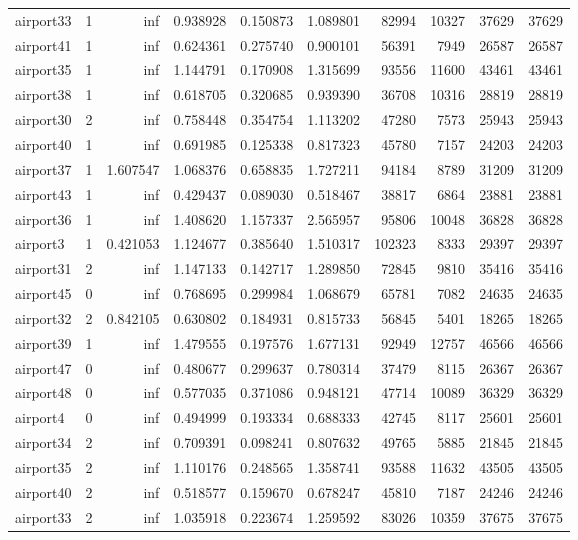 \begin{longtable}{|l|r|r|r|r|r|r|r|r|r|}
airport33 & 1 & inf & 0.938928 & 0.150873 & 1.089801 & 82994 & 10327 & 37629 & 37629 \\
airport41 & 1 & inf & 0.624361 & 0.275740 & 0.900101 & 56391 & 7949 & 26587 & 26587 \\
airport35 & 1 & inf & 1.144791 & 0.170908 & 1.315699 & 93556 & 11600 & 43461 & 43461 \\
airport38 & 1 & inf & 0.618705 & 0.320685 & 0.939390 & 36708 & 10316 & 28819 & 28819 \\
airport30 & 2 & inf & 0.758448 & 0.354754 & 1.113202 & 47280 & 7573 & 25943 & 25943 \\
airport40 & 1 & inf & 0.691985 & 0.125338 & 0.817323 & 45780 & 7157 & 24203 & 24203 \\
airport37 & 1 & 1.607547 & 1.068376 & 0.658835 & 1.727211 & 94184 & 8789 & 31209 & 31209 \\
airport43 & 1 & inf & 0.429437 & 0.089030 & 0.518467 & 38817 & 6864 & 23881 & 23881 \\
airport36 & 1 & inf & 1.408620 & 1.157337 & 2.565957 & 95806 & 10048 & 36828 & 36828 \\
airport3 & 1 & 0.421053 & 1.124677 & 0.385640 & 1.510317 & 102323 & 8333 & 29397 & 29397 \\
airport31 & 2 & inf & 1.147133 & 0.142717 & 1.289850 & 72845 & 9810 & 35416 & 35416 \\
airport45 & 0 & inf & 0.768695 & 0.299984 & 1.068679 & 65781 & 7082 & 24635 & 24635 \\
airport32 & 2 & 0.842105 & 0.630802 & 0.184931 & 0.815733 & 56845 & 5401 & 18265 & 18265 \\
airport39 & 1 & inf & 1.479555 & 0.197576 & 1.677131 & 92949 & 12757 & 46566 & 46566 \\
airport47 & 0 & inf & 0.480677 & 0.299637 & 0.780314 & 37479 & 8115 & 26367 & 26367 \\
airport48 & 0 & inf & 0.577035 & 0.371086 & 0.948121 & 47714 & 10089 & 36329 & 36329 \\
airport4 & 0 & inf & 0.494999 & 0.193334 & 0.688333 & 42745 & 8117 & 25601 & 25601 \\
airport34 & 2 & inf & 0.709391 & 0.098241 & 0.807632 & 49765 & 5885 & 21845 & 21845 \\
airport35 & 2 & inf & 1.110176 & 0.248565 & 1.358741 & 93588 & 11632 & 43505 & 43505 \\
airport40 & 2 & inf & 0.518577 & 0.159670 & 0.678247 & 45810 & 7187 & 24246 & 24246 \\
airport33 & 2 & inf & 1.035918 & 0.223674 & 1.259592 & 83026 & 10359 & 37675 & 37675 \\

\end{longtable}
